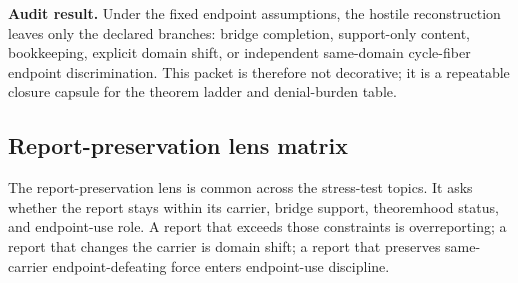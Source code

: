 \documentclass[11pt]{article}
\begin{document}
\par\noindent\textbf{Audit result.} Under the fixed endpoint assumptions, the hostile reconstruction leaves only the declared branches: bridge completion, support-only content, bookkeeping, explicit domain shift, or independent same-domain cycle-fiber endpoint discrimination. This packet is therefore not decorative; it is a repeatable closure capsule for the theorem ladder and denial-burden table.


\subsection{Report-preservation lens matrix}

The report-preservation lens is common across the stress-test topics. It asks whether the report stays within its carrier, bridge support, theoremhood status, and endpoint-use role. A report that exceeds those constraints is overreporting; a report that changes the carrier is domain shift; a report that preserves same-carrier endpoint-defeating force enters endpoint-use discipline.
\end{document}
